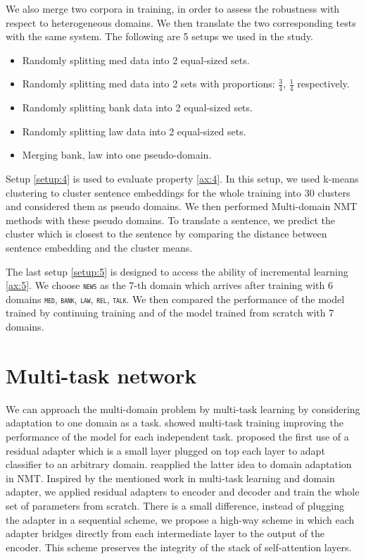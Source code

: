 \documentclass[12pt,a4paper,twoside]{report}
\theoremstyle{definition}
\newcommand{\domain}[1]{\texttt{\textsc{#1}}}
\begin{document}
We also merge two corpora in training, in order to assess the robustness with respect to heterogeneous domains. We then translate the two corresponding tests with the same system. The following are 5 setups we used in the study.
\begin{itemize}
	\item Randomly splitting med data into 2 equal-sized sets.
 	\item Randomly splitting med data into 2 sets with proportions: $\frac{3}{4}$, $\frac{1}{4}$ respectively.
	\item Randomly splitting bank data into 2 equal-sized sets.
	\item Randomly splitting law data into 2 equal-sized sets.
	\item Merging bank, law into one pseudo-domain.
\end{itemize}

Setup \ref{setup:4} is used to evaluate property \ref{ax:4}. In this setup, we used k-means clustering to cluster sentence embeddings for the whole training into 30 clusters and considered them as pseudo domains. We then performed Multi-domain NMT methods with these pseudo domains. To translate a sentence, we predict the cluster which is closest to the sentence by comparing the distance between sentence embedding and the cluster means. 

The last setup \ref{setup:5} is designed to access the ability of incremental learning \ref{ax:5}. We choose \domain{news} as the 7-th domain which arrives after training with 6 domains \domain{med}, \domain{bank}, \domain{law}, \domain{rel}, \domain{talk}. We then compared the performance of the model trained by continuing training and of the model trained from scratch with 7 domains.

\section*{Multi-task network}
We can approach the multi-domain problem by multi-task learning by considering adaptation to one domain as a task. \cite{Caruana97multitask} showed multi-task training improving the performance of the model for each independent task. \cite{rebuffi18efficient} proposed the first use of a residual adapter which is a small layer plugged on top each layer to adapt classifier to an arbitrary domain. \cite{bapna19simple} reapplied the latter idea to domain adaptation in NMT. Inspired by the mentioned work in multi-task learning and domain adapter, we applied residual adapters to encoder and decoder and train the whole set of parameters from scratch. There is a small difference, instead of plugging the adapter in a sequential scheme, we propose a high-way scheme in which each adapter bridges directly from each intermediate layer to the output of the encoder. This scheme preserves the integrity of the stack of self-attention layers.
\end{document}
